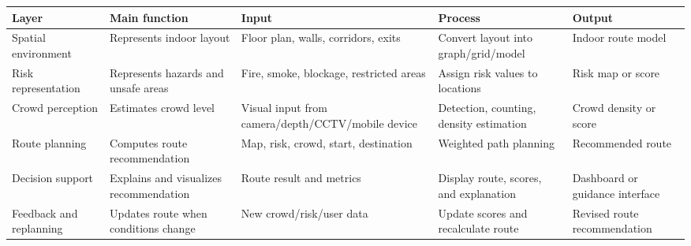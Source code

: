 \documentclass[
]{article}
\newcounter{none} %
\begin{document}
{\def\LTcaptype{none} %
\begin{longtable}[]{@{}
  >{\raggedright\arraybackslash}p{}
  >{\raggedright\arraybackslash}p{}
  >{\raggedright\arraybackslash}p{}
  >{\raggedright\arraybackslash}p{}
  >{\raggedright\arraybackslash}p{}@{}}
\toprule\noalign{}
\begin{minipage}[b]{\linewidth}\raggedright
Layer
\end{minipage} & \begin{minipage}[b]{\linewidth}\raggedright
Main function
\end{minipage} & \begin{minipage}[b]{\linewidth}\raggedright
Input
\end{minipage} & \begin{minipage}[b]{\linewidth}\raggedright
Process
\end{minipage} & \begin{minipage}[b]{\linewidth}\raggedright
Output
\end{minipage} \\
\midrule\noalign{}
\endhead
\bottomrule\noalign{}
\endlastfoot
Spatial environment & Represents indoor layout & Floor plan, walls,
corridors, exits & Convert layout into graph/grid/model & Indoor route
model \\
Risk representation & Represents hazards and unsafe areas & Fire, smoke,
blockage, restricted areas & Assign risk values to locations & Risk map
or score \\
Crowd perception & Estimates crowd level & Visual input from
camera/depth/CCTV/mobile device & Detection, counting, density
estimation & Crowd density or score \\
Route planning & Computes route recommendation & Map, risk, crowd,
start, destination & Weighted path planning & Recommended route \\
Decision support & Explains and visualizes recommendation & Route result
and metrics & Display route, scores, and explanation & Dashboard or
guidance interface \\
Feedback and replanning & Updates route when conditions change & New
crowd/risk/user data & Update scores and recalculate route & Revised
route recommendation \\
\end{longtable}
}
\end{document}
